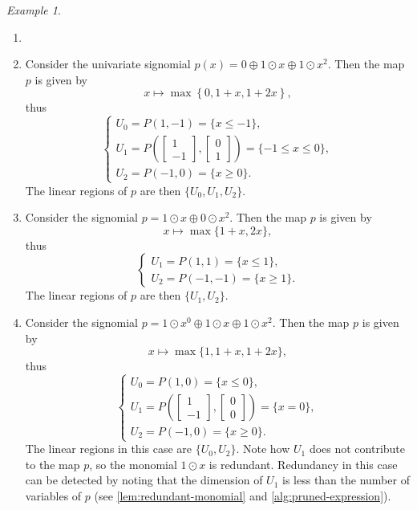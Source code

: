 \documentclass[10pt]{article}
\theoremstyle{definition}
\theoremstyle{remark}
\newtheorem{example}[theorem]{Example}
\begin{document}
\begin{example}\label{eg:signomials}
    \begin{enumerate}
        \item[]
        \item Consider the univariate signomial $p(x)=0\oplus 1 \odot x \oplus 1 \odot x^2$. Then the map $p$ is given by
        $$
        x\mapsto\max\left\{0,1+x,1+2x\right\},
        $$
        thus
        $$
        \begin{cases}
            U_0=P(1,-1)=\{x\le-1\},\\
            U_1=P\left(\begin{bmatrix} 1 \\ -1\end{bmatrix},\begin{bmatrix}0\\1\end{bmatrix}\right)=\{-1\leq x\leq0\},\\U_2=P(-1,0)=\{x\ge0\}.
        \end{cases}
        $$
        The linear regions of $p$ are then $\{U_0,U_1,U_2\}$.
        \item Consider the signomial $p=1\odot x\oplus0 \odot x^2$. Then the map $p$ is given by 
        $$
        x\mapsto\max\{1+x,2x\},
        $$
        thus
        $$
        \begin{cases}
            U_1=P(1,1)=\{x\leq1\},\\
            U_2=P(-1,-1)=\{x\geq1\}.
        \end{cases}
        $$
        The linear regions of $p$ are then $\{U_1,U_2\}$.
        \item Consider the signomial $p=1 \odot x^0\oplus 1 \odot x \oplus 1 \odot x ^2$. Then the map $p$ is given by 
        $$
        x\mapsto\max\{1,1+x,1+2x\},
        $$
        thus
        $$
        \begin{cases}U_0=P(1,0)=\{x\leq0\},\\
            U_1=P\left(\begin{bmatrix}1 \\ -1\end{bmatrix},\begin{bmatrix}0\\0\end{bmatrix}\right)=\{x=0\},\\
            U_2=P(-1,0)=\{x\geq0\}.
        \end{cases}
        $$
        The linear regions in this case are $\{U_0,U_2\}$. Note how $U_1$ does not contribute to the map $p$, so the monomial $1\odot x$ is redundant. Redundancy in this case can be detected by noting that the dimension of $U_1$ is less than the number of variables of $p$ (see \cref{lem:redundant-monomial} and \cref{alg:pruned-expression}).

\end{enumerate}
\end{example}
\end{document}

